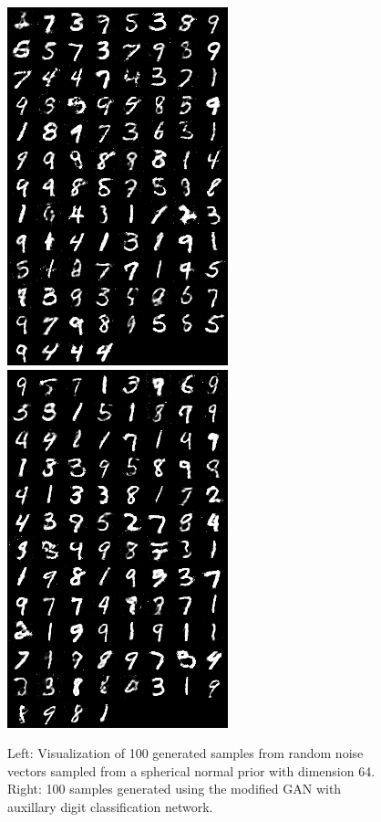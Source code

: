 \documentclass[11pt]{article}
\begin{document}
\begin{figure}[H]
	\begin{center}
		\includegraphics[scale=0.5]{fake_images-200}
		\includegraphics[scale=0.5]{fake_images-200-mod}
		\label{fig:gan-vis}
		\caption{Left: Visualization of 100 generated samples from random noise vectors sampled from a spherical normal prior with dimension 64. Right: 100 samples generated using the modified GAN with auxillary digit classification network.}
	\end{center} 
\end{figure}
\end{document}
